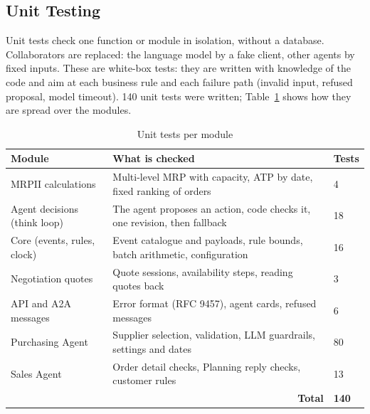 \subsection{Unit Testing}

Unit tests check one function or module in isolation, without a database. Collaborators are replaced: the language
model by a fake client, other agents by fixed inputs. These are white-box tests: they are written with knowledge of the
code and aim at each business rule and each failure path (invalid input, refused proposal, model timeout).
140 unit tests were written; Table~\ref{tab:unit-summary} shows how they are spread over the modules.

\begin{table}[h]
\centering
\small
\renewcommand{\arraystretch}{1.2}
\begin{tabular}{|p{}|p{}|p{}|}
\hline
\textbf{Module} & \textbf{What is checked} & \textbf{Tests} \\ \hline
MRPII calculations & Multi-level MRP with capacity, ATP by date, fixed ranking of orders & 4 \\ \hline
Agent decisions (think loop) & The agent proposes an action, code checks it, one revision, then fallback & 18 \\ \hline
Core (events, rules, clock) & Event catalogue and payloads, rule bounds, batch arithmetic, configuration & 16 \\ \hline
Negotiation quotes & Quote sessions, availability steps, reading quotes back & 3 \\ \hline
API and A2A messages & Error format (RFC 9457), agent cards, refused messages & 6 \\ \hline
Purchasing Agent & Supplier selection, validation, LLM guardrails, settings and dates & 80 \\ \hline
Sales Agent & Order detail checks, Planning reply checks, customer rules & 13 \\ \hline
\multicolumn{2}{|r|}{\textbf{Total}} & \textbf{140} \\ \hline
\end{tabular}
\caption{Unit tests per module}
\label{tab:unit-summary}
\end{table}

